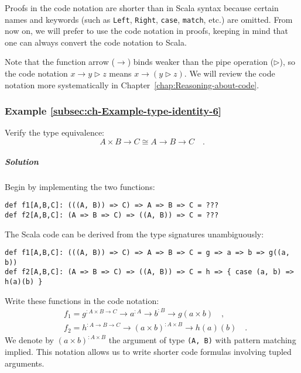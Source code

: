 Proofs in the code notation are shorter than in Scala syntax because
certain names and keywords (such as \lstinline!Left!, \lstinline!Right!,
\lstinline!case!, \lstinline!match!, etc.) are omitted. From now
on, we will prefer to use the code notation in proofs, keeping in
mind that one can always convert the code notation to Scala.

Note that the function arrow ($\rightarrow$) binds weaker than the
pipe operation ($\triangleright$), so the code notation $x\rightarrow y\triangleright z$
means $x\rightarrow(y\triangleright z)$. We will review the code
notation more systematically in Chapter~\ref{chap:Reasoning-about-code}.

\subsubsection{Example \label{subsec:ch-Example-type-identity-6}\ref{subsec:ch-Example-type-identity-6}}

Verify the type equivalence:
\[
A\times B\rightarrow C\cong A\rightarrow B\rightarrow C\quad.
\]


\subparagraph{Solution}

Begin by implementing the two functions:
\begin{lstlisting}
def f1[A,B,C]: (((A, B)) => C) => A => B => C = ???
def f2[A,B,C]: (A => B => C) => ((A, B)) => C = ???
\end{lstlisting}
The Scala code can be derived from the type signatures unambiguously:
\begin{lstlisting}
def f1[A,B,C]: (((A, B)) => C) => A => B => C = g => a => b => g((a, b))
def f2[A,B,C]: (A => B => C) => ((A, B)) => C = h => { case (a, b) => h(a)(b) }
\end{lstlisting}
Write these functions in the code notation:
\begin{align*}
 & f_{1}=g^{:A\times B\rightarrow C}\rightarrow a^{:A}\rightarrow b^{:B}\rightarrow g(a\times b)\quad,\\
 & f_{2}=h^{:A\rightarrow B\rightarrow C}\rightarrow\left(a\times b\right)^{:A\times B}\rightarrow h(a)(b)\quad.
\end{align*}
We denote by $\left(a\times b\right)^{:A\times B}$ the argument of
type \lstinline!(A, B)! with pattern matching implied. This notation
allows us to write shorter code formulas involving tupled arguments.

